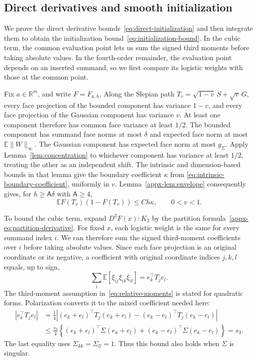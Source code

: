 \documentclass[11pt,letterpaper]{article}
\theoremstyle{remark}
\newcommand{\E}{\mathbb E}
\newcommand{\R}{\mathbb R}
\begin{document}
\subsection{Direct derivatives and smooth initialization}
\label{appx-an:sec:initialization}

We prove the direct derivative bounds~\eqref{eq:direct-initialization}
and then integrate them to obtain the initialization
bound~\eqref{eq:initialization-bound}. In the cubic term, the common
evaluation point lets us sum the signed third moments before taking
absolute values. In the fourth-order remainder, the evaluation point
depends on an inserted summand, so we first compare its logistic
weights with those at the common point.

Fix \(a\in\R^m\), and write \(F=F_{a,h}\).
Along the Slepian path
\(T_v=\sqrt{1-v}\,S+\sqrt v\,G\), every face projection of the
bounded component has variance \(1-v\), and every face projection
of the Gaussian component has variance \(v\). At least one component
therefore has common face variance at least \(1/2\).
The bounded component has summand face norms at most \(\delta\)
and expected face norm at most \(\E\|W\|_\infty\).
The Gaussian component has expected face norm at most \(g_\Sigma\).
Apply Lemma~\ref{lem:concentration} to whichever component has
variance at least \(1/2\), treating the other as an independent
shift. The intrinsic and dimension-based bounds in that lemma give
the boundary coefficient \(\kappa\) from
\eqref{eq:intrinsic-boundary-coefficient}, uniformly in \(v\).
Lemma~\ref{appx-lem:envelope} consequently gives, for
\(h\ge\mathsf A\delta\) with \(\mathsf A\ge4\),
\begin{equation}
 \E F(T_v)(1-F(T_v))\le Ch\kappa,
 \qquad 0<v<1.
 \label{eq:slepian-weight}
\end{equation}

To bound the cubic term, expand \(D^3F(x):K_3\) by the partition
formula~\eqref{appx-eq:partition-derivative}. For fixed $x$, each
logistic weight is the same for every summand index $i$. We can
therefore sum the signed third-moment coefficients over $i$ before
taking absolute values. Since each face projection is an original
coordinate or its
negative, a coefficient with original coordinate indices \(j,k,l\)
equals, up to sign,
\[
 \sum_i\E[\xi_{ij}\xi_{ik}\xi_{il}]=e_k^\top T_j e_l.
\]
The third-moment assumption in~\eqref{eq:relative-moments} is stated
for quadratic forms. Polarization converts it to the mixed
coefficient needed here:
\[
 \begin{aligned}
 |e_k^\top T_j e_l|
 &=\frac14\left|
   (e_k+e_l)^\top T_j(e_k+e_l)
   -(e_k-e_l)^\top T_j(e_k-e_l)\right|\\
 &\le\frac{s_3}{4}\left\{
   (e_k+e_l)^\top\Sigma(e_k+e_l)
   +(e_k-e_l)^\top\Sigma(e_k-e_l)\right\}
 =s_3.
 \end{aligned}
\]
The last equality uses \(\Sigma_{kk}=\Sigma_{ll}=1\).
Thus this bound also holds when \(\Sigma\) is singular.
\end{document}
